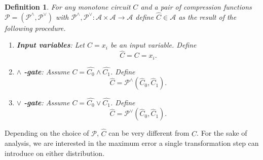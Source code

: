 \documentclass[10pt,a4paper]{article}
\newtheorem{definition}[theorem]{Definition}
\newcommand{\jnote}[1]{\todo[inline,backgroundcolor=blue!20!green]{#1 \\ \textsc{--Jarek}}}
\begin{document}

\begin{definition}
\label{def:approximation}
    For any monotone circuit $C$ and a pair of compression  functions $\mathcal{P} = (\mathcal{P}^\wedge, \mathcal{P}^\vee)$ with $\mathcal{P}^\wedge, \mathcal{P}^\vee: \mathcal{A} \times \mathcal{A} \rightarrow \mathcal{A}$ define $\hat{C} \in \mathcal{A}$ as the result of the following procedure.
    \begin{enumerate}
        \item \textbf{Input variables}: Let $C=x_i$ be an input variable. Define 
        \begin{equation*}
            \hat{C} = C = x_i.
        \end{equation*}
        \item {$\wedge$ \textbf{-gate}}: Assume $C = \hat{C_0} \wedge \hat{C_1}$. Define
        \begin{equation*}
            \hat{C} = \mathcal{P}^\wedge(\hat{C}_0, \hat{C}_1).
        \end{equation*}
        \item {$\vee$ \textbf{-gate}}: Assume $C = \hat{C_0} \vee \hat{C_1}$. Define 
        \begin{equation*}
            \hat{C} = \mathcal{P}^\vee(\hat{C}_0, \hat{C}_1).
        \end{equation*}
    \end{enumerate}
\end{definition}

Depending on the choice of $\mathcal{P}$, $\hat{C}$ can be very different from $C$. For the sake of analysis, we are interested in the maximum error a single transformation step can introduce on either distribution.
\end{document}
